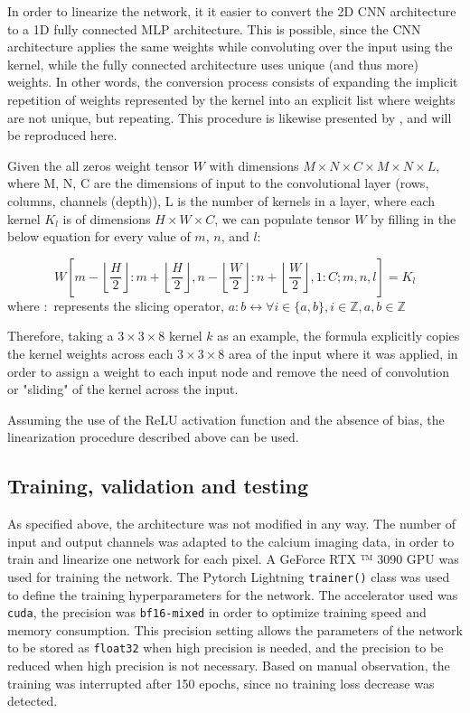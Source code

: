 In order to linearize the network, it it easier to convert the 2D CNN architecture to a 1D fully connected MLP architecture. This is possible, since the CNN architecture applies the same weights while convoluting over the input using the kernel, while the fully connected architecture uses unique (and thus more) weights. In other words, the conversion process consists of expanding the implicit repetition of weights represented by the kernel into an explicit list where weights are not unique, but repeating. This procedure is likewise presented by \textcite{keshishianEstimatingInterpretingNonlinear2020}, and will be reproduced here.

Given the all zeros weight tensor $W$ with dimensions $M \times N \times C \times M \times N \times L$, where M, N, C are the dimensions of input to the convolutional layer (rows, columns, channels (depth)), L is the number of kernels in a layer, where each kernel $K_l$ is of dimensions $H \times W \times C$, we can populate tensor $W$ by filling in the below equation for every value of $m$, $n$, and $l$:

\begin{equation}
	W\left[m - \left\lfloor\frac{H}{2}\right\rfloor:m+ \left\lfloor\frac{H}{2}\right\rfloor, n- \left\lfloor\frac{W}{2}\right\rfloor:n+ \left\lfloor\frac{W}{2}\right\rfloor, 1:C; m, n, l\right] = K_l
\end{equation} 
\noindent where $:$ represents the slicing operator, $a:b \leftrightarrow \forall i \in \{a, b\}, i \in \mathbb{Z}, a, b \in \mathbb{Z}$

Therefore, taking a $3 \times 3 \times 8$ kernel $k$ as an example, the formula explicitly copies the kernel weights across each $3 \times 3 \times 8$ area of the input where it was applied, in order to assign a weight to each input node and remove the need of convolution or "sliding" of the kernel across the input.

Assuming the use of the ReLU activation function and the absence of bias, the linearization procedure described above can be used.


\subsection{Training, validation and testing}
As specified above, the architecture was not modified in any way. The number of input and output channels was adapted to the calcium imaging data, in order to train and linearize one network for each pixel. A  GeForce RTX ™ 3090 GPU was used for training the network. The Pytorch Lightning \verb|trainer()| class was used to define the training hyperparameters for the network. The accelerator used was \verb|cuda|, the precision was \verb|bf16-mixed| in order to optimize training speed and memory consumption. This precision setting allows the parameters of the network to be stored as \verb|float32| when high precision is needed, and the precision to be reduced when high precision is not necessary. Based on manual observation, the training was interrupted after 150 epochs, since no training loss decrease was detected.


